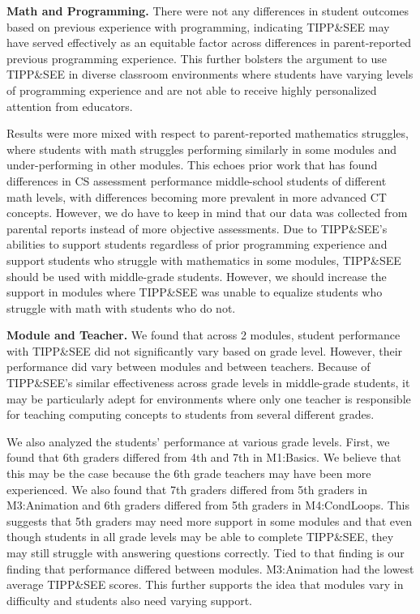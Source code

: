 \documentclass[sigconf,manuscript,review,anonymous]{acmart} %
\def\ts{TIPP\&SEE}
\begin{document}
\textbf{Math and Programming.} There were not any differences in student outcomes based on previous experience with programming, indicating \ts{} may have served effectively as an equitable factor across differences in parent-reported previous programming experience. This further bolsters the argument to use \ts{} in diverse classroom environments where students have varying levels of programming experience and are not able to receive highly personalized attention from educators. 

Results were more mixed with respect to parent-reported mathematics struggles, where students with math struggles performing similarly in some modules and under-performing in other modules. This echoes prior work that has found differences in CS assessment performance %
middle-school students \cite{grover2016factors,qian2016correlates} of different math levels, with differences becoming more prevalent in more advanced CT concepts. However, we do have to keep in mind that our data was collected from parental reports instead of more objective assessments. Due to \ts{}'s abilities to support students regardless of prior programming experience and support students who struggle with mathematics in some modules, \ts{} should be used with middle-grade students. However, we should increase the support in modules where \ts{} was unable to equalize students who struggle with math with students who do not.

\textbf{Module and Teacher.} We found that across 2 modules, student performance with \ts{} did not significantly vary based on grade level. However, their performance did vary between modules and between teachers. Because of \ts{}'s similar effectiveness across grade levels in middle-grade students, it may be particularly adept for environments where only one teacher is responsible for teaching computing concepts to students from several different grades. 

We also analyzed the students' performance at various grade levels. First, we found that 6th graders differed from 4th and 7th in M1:Basics. We believe that this may be the case because the 6th grade teachers may have been more experienced. We also found that 7th graders differed from 5th graders in M3:Animation and 6th graders differed from 5th graders in M4:CondLoops. This suggests that 5th graders may need more support in some modules and that even though students in all grade levels may be able to complete \ts{}, they may still struggle with answering questions correctly. Tied to that finding is our finding that performance differed between modules. M3:Animation had the lowest average \ts{} scores. This further supports the idea that modules vary in difficulty and students also need varying support. 
\end{document}
